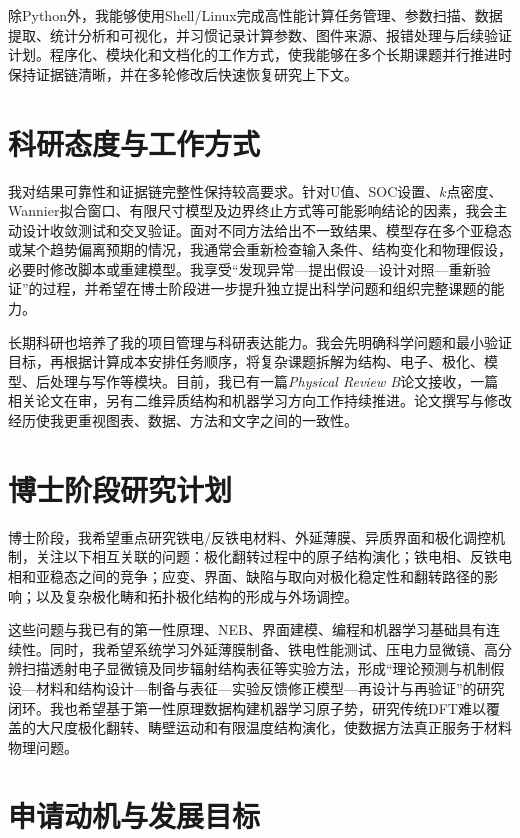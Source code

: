 除Python外，我能够使用Shell/Linux完成高性能计算任务管理、参数扫描、数据提取、统计分析和可视化，并习惯记录计算参数、图件来源、报错处理与后续验证计划。程序化、模块化和文档化的工作方式，使我能够在多个长期课题并行推进时保持证据链清晰，并在多轮修改后快速恢复研究上下文。

\section{科研态度与工作方式}

我对结果可靠性和证据链完整性保持较高要求。针对U值、SOC设置、$k$点密度、Wannier拟合窗口、有限尺寸模型及边界终止方式等可能影响结论的因素，我会主动设计收敛测试和交叉验证。面对不同方法给出不一致结果、模型存在多个亚稳态或某个趋势偏离预期的情况，我通常会重新检查输入条件、结构变化和物理假设，必要时修改脚本或重建模型。我享受“发现异常—提出假设—设计对照—重新验证”的过程，并希望在博士阶段进一步提升独立提出科学问题和组织完整课题的能力。

长期科研也培养了我的项目管理与科研表达能力。我会先明确科学问题和最小验证目标，再根据计算成本安排任务顺序，将复杂课题拆解为结构、电子、极化、模型、后处理与写作等模块。目前，我已有一篇\textit{Physical Review B}论文接收，一篇相关论文在审，另有二维异质结构和机器学习方向工作持续推进。论文撰写与修改经历使我更重视图表、数据、方法和文字之间的一致性。

\section{博士阶段研究计划}

博士阶段，我希望重点研究铁电/反铁电材料、外延薄膜、异质界面和极化调控机制，关注以下相互关联的问题：极化翻转过程中的原子结构演化；铁电相、反铁电相和亚稳态之间的竞争；应变、界面、缺陷与取向对极化稳定性和翻转路径的影响；以及复杂极化畴和拓扑极化结构的形成与外场调控。

这些问题与我已有的第一性原理、NEB、界面建模、编程和机器学习基础具有连续性。同时，我希望系统学习外延薄膜制备、铁电性能测试、压电力显微镜、高分辨扫描透射电子显微镜及同步辐射结构表征等实验方法，形成“理论预测与机制假设—材料和结构设计—制备与表征—实验反馈修正模型—再设计与再验证”的研究闭环。我也希望基于第一性原理数据构建机器学习原子势，研究传统DFT难以覆盖的大尺度极化翻转、畴壁运动和有限温度结构演化，使数据方法真正服务于材料物理问题。

\section{申请动机与发展目标}

